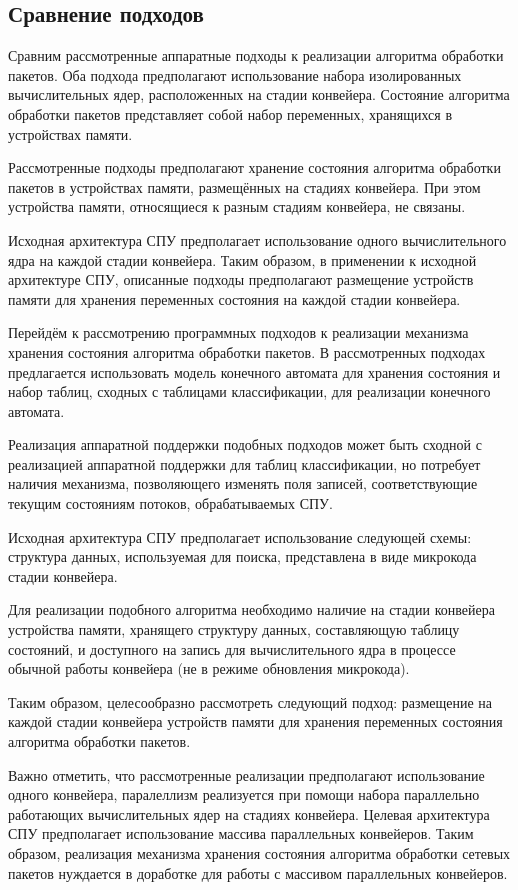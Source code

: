 \documentclass[conference]{IEEEtran}
\begin{document}
\subsection{Сравнение подходов}
Сравним рассмотренные аппаратные подходы к реализации алгоритма обработки
пакетов. Оба подхода предполагают использование набора изолированных
вычислительных ядер, расположенных на стадии конвейера. Состояние
алгоритма обработки пакетов представляет собой набор переменных,
хранящихся в устройствах памяти.

Рассмотренные подходы предполагают хранение состояния алгоритма обработки
пакетов в устройствах памяти, размещённых на стадиях конвейера.
При этом устройства памяти, относящиеся к разным стадиям конвейера,
не связаны.

Исходная архитектура СПУ предполагает использование одного вычислительного
ядра на каждой стадии конвейера. Таким образом, в применении к исходной
архитектуре СПУ, описанные подходы предполагают размещение устройств
памяти для хранения переменных состояния на каждой стадии конвейера.

Перейдём к рассмотрению программных подходов к реализации механизма
хранения состояния алгоритма обработки пакетов.
В рассмотренных подходах предлагается использовать модель конечного автомата
для хранения состояния и набор таблиц, сходных с таблицами классификации,
для реализации конечного автомата.

Реализация аппаратной поддержки подобных подходов может быть сходной
с реализацией аппаратной поддержки для таблиц классификации,
но потребует наличия механизма, позволяющего изменять поля записей,
соответствующие текущим состояниям потоков, обрабатываемых СПУ.

Исходная архитектура СПУ предполагает использование следующей схемы:
структура данных, используемая для поиска, представлена в виде
микрокода стадии конвейера.

Для реализации подобного алгоритма необходимо наличие на стадии конвейера
устройства памяти, хранящего структуру данных, составляющую таблицу
состояний,
и доступного на запись для вычислительного ядра в процессе обычной работы
конвейера (не в режиме обновления микрокода).

Таким образом, целесообразно рассмотреть следующий подход: размещение
на каждой стадии конвейера устройств памяти для хранения переменных состояния
алгоритма обработки пакетов.

Важно отметить, что рассмотренные реализации предполагают использование
одного конвейера, паралеллизм реализуется при помощи набора параллельно
работающих вычислительных ядер на стадиях конвейера. Целевая архитектура
СПУ предполагает использование
массива параллельных конвейеров. Таким образом, реализация механизма
хранения состояния алгоритма обработки сетевых пакетов нуждается в доработке
для работы с массивом параллельных конвейеров.
\end{document}
